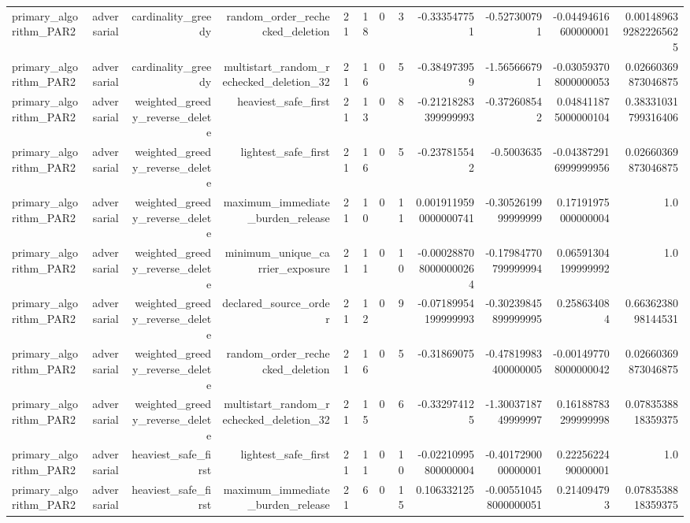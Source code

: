 {\begin{longtable}{lrrrrrrrrrrr}
primary\_algorithm\_PAR2 & adversarial & cardinality\_greedy & random\_order\_rechecked\_deletion & 21 & 18 & 0 & 3 & -0.333547751 & -0.527300791 & -0.04494616600000001 & 0.0014896392822265625 \\
primary\_algorithm\_PAR2 & adversarial & cardinality\_greedy & multistart\_random\_rechecked\_deletion\_32 & 21 & 16 & 0 & 5 & -0.384973959 & -1.565666791 & -0.030593708000000053 & 0.02660369873046875 \\
primary\_algorithm\_PAR2 & adversarial & weighted\_greedy\_reverse\_delete & heaviest\_safe\_first & 21 & 13 & 0 & 8 & -0.21218283399999993 & -0.372608542 & 0.048411875000000104 & 0.38331031799316406 \\
primary\_algorithm\_PAR2 & adversarial & weighted\_greedy\_reverse\_delete & lightest\_safe\_first & 21 & 16 & 0 & 5 & -0.237815542 & -0.5003635 & -0.043872916999999956 & 0.02660369873046875 \\
primary\_algorithm\_PAR2 & adversarial & weighted\_greedy\_reverse\_delete & maximum\_immediate\_burden\_release & 21 & 10 & 0 & 11 & 0.0019119590000000741 & -0.3052619999999999 & 0.17191975000000004 & 1.0 \\
primary\_algorithm\_PAR2 & adversarial & weighted\_greedy\_reverse\_delete & minimum\_unique\_carrier\_exposure & 21 & 11 & 0 & 10 & -0.0002887080000000264 & -0.17984770799999994 & 0.06591304199999992 & 1.0 \\
primary\_algorithm\_PAR2 & adversarial & weighted\_greedy\_reverse\_delete & declared\_source\_order & 21 & 12 & 0 & 9 & -0.07189954199999993 & -0.30239845899999995 & 0.258634084 & 0.6636238098144531 \\
primary\_algorithm\_PAR2 & adversarial & weighted\_greedy\_reverse\_delete & random\_order\_rechecked\_deletion & 21 & 16 & 0 & 5 & -0.31869075 & -0.47819983400000005 & -0.001497708000000042 & 0.02660369873046875 \\
primary\_algorithm\_PAR2 & adversarial & weighted\_greedy\_reverse\_delete & multistart\_random\_rechecked\_deletion\_32 & 21 & 15 & 0 & 6 & -0.332974125 & -1.3003718749999997 & 0.16188783299999998 & 0.0783538818359375 \\
primary\_algorithm\_PAR2 & adversarial & heaviest\_safe\_first & lightest\_safe\_first & 21 & 11 & 0 & 10 & -0.02210995800000004 & -0.4017290000000001 & 0.2225622490000001 & 1.0 \\
primary\_algorithm\_PAR2 & adversarial & heaviest\_safe\_first & maximum\_immediate\_burden\_release & 21 & 6 & 0 & 15 & 0.106332125 & -0.005510458000000051 & 0.214094793 & 0.0783538818359375 \\

\end{longtable}}
